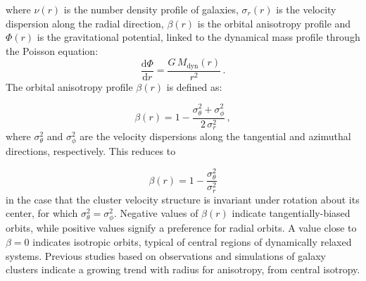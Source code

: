 \documentclass{aa}
\begin{document}
\noindent where $\nu(r)$ is the number density profile of galaxies, $\sigma_r(r)$ is the velocity dispersion along the radial direction, $\beta(r)$ is the orbital anisotropy profile and $\Phi(r)$ is the gravitational potential, linked to the dynamical mass profile through the Poisson equation:
\begin{equation}
    \frac{\text{d}\Phi}{\text{d}r} = \frac{G \, M_{\text{dyn}}(r)}{r^2} \, .
\end{equation}
The orbital anisotropy profile $\beta(r)$ is defined as:

\begin{equation}
    \beta(r) = 1 - \frac{\sigma_\theta^2 + \sigma_\phi^2}{2 \,\sigma_r^2} \, ,
\end{equation}
where  $\sigma^2_\theta$ and $\sigma^2_\phi$ are the velocity dispersions along the tangential and azimuthal directions, respectively. This reduces to 

\begin{equation}
    \beta(r) = 1 - \frac{\sigma_\theta^2}{\sigma_r^2} 
    \label{eq:beta_profile}
\end{equation}
in the case that the cluster velocity structure is invariant under rotation about its center, for which $\sigma^2_\theta =\sigma^2_\phi$. Negative values of $\beta(r)$ indicate tangentially-biased orbits, while positive values signify a preference for radial orbits. A value close to $\beta = 0$ indicates isotropic orbits, typical of central regions of dynamically relaxed systems. Previous studies based on observations \citep[\textit{e.g.}][]{Host_2009, Biviano_2013} and simulations \citep[\textit{e.g.}][]{Hansen_2006, Mamon_2010} of galaxy clusters indicate a growing trend with radius for anisotropy, from central isotropy. %

\end{document}
